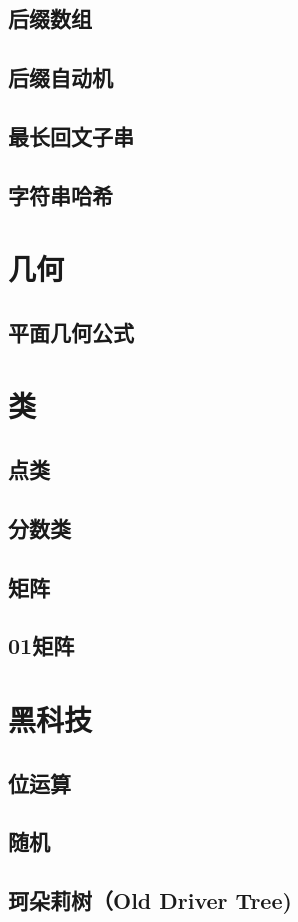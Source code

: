 \section{后缀数组}
\raggedbottom
\hrulefill
\section{后缀自动机}
\raggedbottom
\hrulefill
\section{最长回文子串}
\raggedbottom
\hrulefill
\section{字符串哈希}
\raggedbottom
\hrulefill

\chapter{几何}
\section{平面几何公式}
\raggedbottom
\hrulefill

\chapter{类}
\section{点类}
\raggedbottom
\hrulefill
\section{分数类}
\raggedbottom
\hrulefill
\section{矩阵}
\raggedbottom
\hrulefill
\section{01矩阵}
\raggedbottom
\hrulefill

\chapter{黑科技}
\section{位运算}
\raggedbottom
\hrulefill
\section{随机}
\raggedbottom
\hrulefill
\section{珂朵莉树（Old Driver Tree)}
\raggedbottom
\hrulefill


